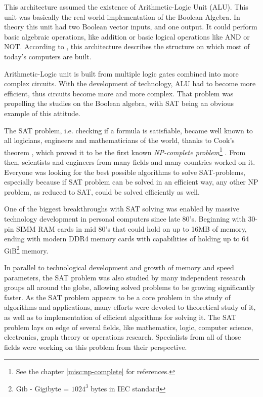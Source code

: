 \documentclass[12pt,english,pdflatex]{aghdpl}
\begin{document}
This architecture assumed the existence of Arithmetic-Logic Unit (ALU). This unit was basically the real world
implementation of the Boolean Algebra. In theory this unit had  two Boolean vector inputs, and one output. It could perform basic
algebraic operations, like addition or basic logical operations like AND or NOT. According to \cite{Matravers:2011}, this architecture describes the structure on which most of today's computers are built.

Arithmetic-Logic unit is built from multiple logic gates combined into more complex circuits. With the development of technology, ALU had to become more efficient, thus circuits become
more and more complex. That problem was propelling the studies on the Boolean algebra,
with SAT being an obvious example of this attitude.

The SAT problem, i.e. checking if a formula is satisfiable, became well known
to all logicians, engineers and mathematicians of the world, thanks
to Cook's theorem \cite{Cook:1971}, which proved it to be the first
known \textit{NP-complete problem}\footnote{See the chapter \ref{misc:np-complete} for references.} . From then, scientists and engineers from
many fields and many countries worked on it. Everyone was looking
for the best possible algorithms to solve SAT-problems, especially
because if SAT problem can be solved in an efficient way, any other NP problem, as reduced to SAT, 
could be solved efficiently as well.

One of the biggest breakthroughs with
SAT solving was enabled by massive technology development in personal
computers since late 80's. Beginning with 30-pin SIMM RAM cards in
mid 80's that could hold on up to 16MB of memory, ending with modern
DDR4 memory cards with capabilities of holding up to 64 GiB\footnote{Gib - Gigibyte = $1024^3$ bytes in IEC standard} memory.

In parallel to technological development and  growth of memory and speed parameters, the SAT problem was also studied by many independent research groups all around the globe, allowing
solved problems to be growing significantly faster. As the SAT problem appears to be a core problem in the study of algorithms and applications, many efforts were
devoted to theoretical study of it, as well as to  implementation of efficient algorithms for solving it. The SAT problem   lays on edge of several fields, like mathematics,
logic, computer science, electronics, graph theory or operations research.
Specialists from all of those fields were working on this problem
from their perspective.
\end{document}
